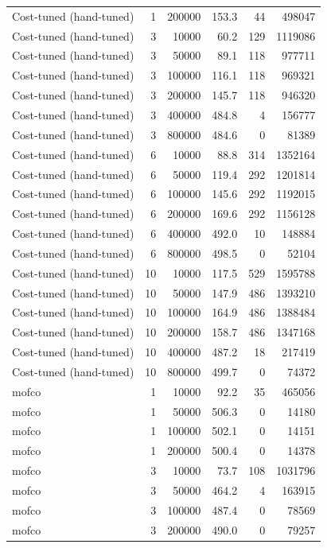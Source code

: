 \begin{table}[h]
\begin{tabular}{@{}lrrrrr@{}}
Cost-tuned (hand-tuned) & 1 & 200000 & 153.3 & 44 & 498047 \\
Cost-tuned (hand-tuned) & 3 & 10000 & 60.2 & 129 & 1119086 \\
Cost-tuned (hand-tuned) & 3 & 50000 & 89.1 & 118 & 977711 \\
Cost-tuned (hand-tuned) & 3 & 100000 & 116.1 & 118 & 969321 \\
Cost-tuned (hand-tuned) & 3 & 200000 & 145.7 & 118 & 946320 \\
Cost-tuned (hand-tuned) & 3 & 400000 & 484.8 & 4 & 156777 \\
Cost-tuned (hand-tuned) & 3 & 800000 & 484.6 & 0 & 81389 \\
Cost-tuned (hand-tuned) & 6 & 10000 & 88.8 & 314 & 1352164 \\
Cost-tuned (hand-tuned) & 6 & 50000 & 119.4 & 292 & 1201814 \\
Cost-tuned (hand-tuned) & 6 & 100000 & 145.6 & 292 & 1192015 \\
Cost-tuned (hand-tuned) & 6 & 200000 & 169.6 & 292 & 1156128 \\
Cost-tuned (hand-tuned) & 6 & 400000 & 492.0 & 10 & 148884 \\
Cost-tuned (hand-tuned) & 6 & 800000 & 498.5 & 0 & 52104 \\
Cost-tuned (hand-tuned) & 10 & 10000 & 117.5 & 529 & 1595788 \\
Cost-tuned (hand-tuned) & 10 & 50000 & 147.9 & 486 & 1393210 \\
Cost-tuned (hand-tuned) & 10 & 100000 & 164.9 & 486 & 1388484 \\
Cost-tuned (hand-tuned) & 10 & 200000 & 158.7 & 486 & 1347168 \\
Cost-tuned (hand-tuned) & 10 & 400000 & 487.2 & 18 & 217419 \\
Cost-tuned (hand-tuned) & 10 & 800000 & 499.7 & 0 & 74372 \\
mofco & 1 & 10000 & 92.2 & 35 & 465056 \\
mofco & 1 & 50000 & 506.3 & 0 & 14180 \\
mofco & 1 & 100000 & 502.1 & 0 & 14151 \\
mofco & 1 & 200000 & 500.4 & 0 & 14378 \\
mofco & 3 & 10000 & 73.7 & 108 & 1031796 \\
mofco & 3 & 50000 & 464.2 & 4 & 163915 \\
mofco & 3 & 100000 & 487.4 & 0 & 78569 \\
mofco & 3 & 200000 & 490.0 & 0 & 79257 \\

\end{tabular}
\end{table}
